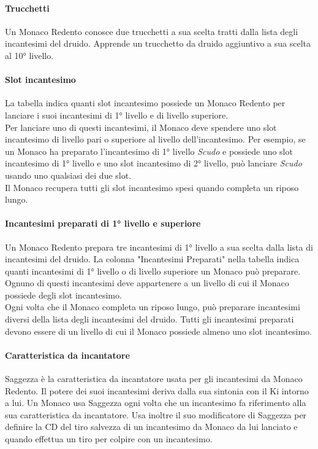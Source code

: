 \paragraph{Trucchetti} Un Monaco Redento conosce due trucchetti a sua scelta tratti dalla lista degli incantesimi del druido. Apprende un trucchetto da druido aggiuntivo a sua scelta al 10° livello.

\paragraph{Slot incantesimo}La tabella indica quanti slot incantesimo possiede un Monaco Redento per lanciare i suoi incantesimi di 1° livello e di livello superiore. \\ Per lanciare uno di questi incantesimi, il Monaco deve spendere uno slot incantesimo di livello pari o superiore al livello dell'incantesimo. Per esempio, se un Monaco ha preparato l'incantesimo di 1° livello \textit{Scudo} e possiede uno slot incantesimo di 1° livello e uno slot incantesimo di 2° livello, può lanciare \textit{Scudo} usando uno qualsiasi dei due slot. \\ Il Monaco recupera tutti gli slot incantesimo spesi quando completa un riposo lungo.

\paragraph{Incantesimi preparati di 1° livello e superiore}Un Monaco Redento prepara tre incantesimi di 1° livello a sua scelta dalla lista di incantesimi del druido. La colonna "Incantesimi Preparati" nella tabella indica quanti incantesimi di 1° livello o di livello superiore un Monaco può preparare. Ognuno di questi incantesimi deve appartenere a un livello di cui il Monaco possiede degli slot incantesimo.\\ Ogni volta che il Monaco completa un riposo lungo, può preparare incantesimi diversi della lista degli incantesimi del druido. Tutti gli incantesimi preparati devono essere di un livello di cui il Monaco possiede almeno uno slot incantesimo.

\paragraph{Caratteristica da incantatore}Saggezza è la caratteristica da incantatore usata per gli incantesimi da Monaco Redento. Il potere dei suoi incantesimi deriva dalla sua sintonia con il Ki intorno a lui. Un Monaco usa Saggezza ogni volta che un incantesimo fa riferimento alla sua caratteristica da incantatore. Usa inoltre il suo modificatore di Saggezza per definire la CD del tiro salvezza di un incantesimo da Monaco da lui lanciato e quando effettua un tiro per colpire con un incantesimo.

